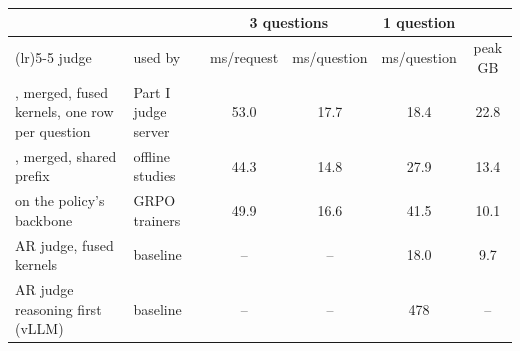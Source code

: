 \begin{tabularx}{\linewidth}{@{}>{\raggedright\arraybackslash}X>{\raggedright\arraybackslash}p{2.2cm}cccc@{}}
\toprule
 & & \multicolumn{2}{c}{3 questions} & 1 question & \\ \cmidrule(lr){3-4}\cmidrule(lr){5-5}
judge & used by & ms/request & ms/question & ms/question & peak GB \\ \midrule
\kev{}, merged, fused kernels, one row per question & Part I judge server & 53.0 & 17.7 & 18.4 & 22.8 \\
\kev{}, merged, shared prefix & offline studies & 44.3 & 14.8 & 27.9 & 13.4 \\
\kev{} on the policy's backbone & GRPO trainers & 49.9 & 16.6 & 41.5 & 10.1 \\
AR judge, fused kernels & baseline & -- & -- & 18.0 & 9.7 \\
AR judge reasoning first (vLLM) & baseline & -- & -- & 478 & -- \\
\bottomrule
\end{tabularx}

